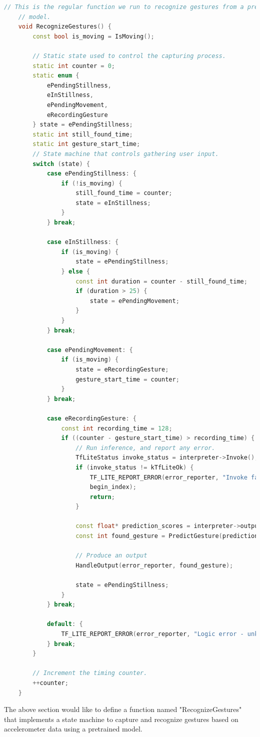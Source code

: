 \begin{lstlisting}[language=C++, caption={Gesture Recognition Using a Pretrained Model in C++}, label={code:gesture-recognition}, style=bashstyle]
	// This is the regular function we run to recognize gestures from a pretrained
	// model.
	void RecognizeGestures() {
		const bool is_moving = IsMoving();
		
		// Static state used to control the capturing process.
		static int counter = 0;
		static enum {
			ePendingStillness,
			eInStillness,
			ePendingMovement,
			eRecordingGesture
		} state = ePendingStillness;
		static int still_found_time;
		static int gesture_start_time;
		// State machine that controls gathering user input.
		switch (state) {
			case ePendingStillness: {
				if (!is_moving) {
					still_found_time = counter;
					state = eInStillness;
				}
			} break;
			
			case eInStillness: {
				if (is_moving) {
					state = ePendingStillness;
				} else {
					const int duration = counter - still_found_time;
					if (duration > 25) {
						state = ePendingMovement;
					}
				}
			} break;
			
			case ePendingMovement: {
				if (is_moving) {
					state = eRecordingGesture;
					gesture_start_time = counter;
				}
			} break;
			
			case eRecordingGesture: {
				const int recording_time = 128;
				if ((counter - gesture_start_time) > recording_time) {
					// Run inference, and report any error.
					TfLiteStatus invoke_status = interpreter->Invoke();
					if (invoke_status != kTfLiteOk) {
						TF_LITE_REPORT_ERROR(error_reporter, "Invoke failed on index: %d\n",
						begin_index);
						return;
					}
					
					const float* prediction_scores = interpreter->output(0)->data.f;
					const int found_gesture = PredictGesture(prediction_scores);
					
					// Produce an output
					HandleOutput(error_reporter, found_gesture);
					
					state = ePendingStillness;
				}
			} break;
			
			default: {
				TF_LITE_REPORT_ERROR(error_reporter, "Logic error - unknown state");
			} break;
		}
		
		// Increment the timing counter.
		++counter;
	}
\end{lstlisting}

The above section would like to define a function named "RecognizeGestures" that implements a state machine to capture and recognize gestures based on accelerometer data using a pretrained model. 

